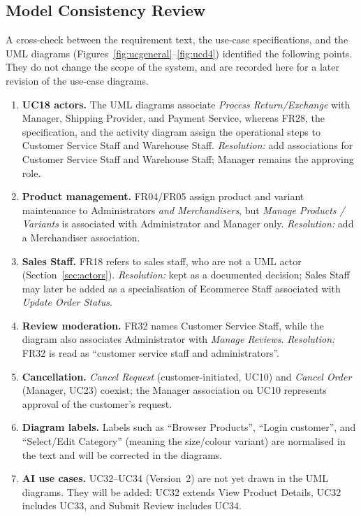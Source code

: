 \documentclass[11pt,a4paper,oneside]{extreport}
\newif\ifshowvtwo
\newcommand{\upd}[1]{\ifshowvtwo\textcolor{red}{#1}\else#1\fi}
\begin{document}
\subsection{Model Consistency Review}
A cross-check between the requirement text, the use-case specifications, and the UML diagrams (Figures~\ref{fig:ucgeneral}--\ref{fig:ucd4}) identified the following points. They do not change the scope of the system, and are recorded here for a later revision of the use-case diagrams.
\begin{enumerate}
  \item \textbf{UC18 actors.} The UML diagrams associate \emph{Process Return/Exchange} with Manager, Shipping Provider, and Payment Service, whereas FR28, the specification, and the activity diagram assign the operational steps to Customer Service Staff and Warehouse Staff. \emph{Resolution:} add associations for Customer Service Staff and Warehouse Staff; Manager remains the approving role.
  \item \textbf{Product management.} FR04/FR05 assign product and variant maintenance to Administrators \emph{and Merchandisers}, but \emph{Manage Products / Variants} is associated with Administrator and Manager only. \emph{Resolution:} add a Merchandiser association.
  \item \textbf{Sales Staff.} FR18 refers to sales staff, who are not a UML actor (Section~\ref{sec:actors}). \emph{Resolution:} kept as a documented decision; Sales Staff may later be added as a specialisation of Ecommerce Staff associated with \emph{Update Order Status}.
  \item \textbf{Review moderation.} FR32 names Customer Service Staff, while the diagram also associates Administrator with \emph{Manage Reviews}. \emph{Resolution:} FR32 is read as ``customer service staff and administrators''.
  \item \textbf{Cancellation.} \emph{Cancel Request} (customer-initiated, UC10) and \emph{Cancel Order} (Manager, UC23) coexist; the Manager association on UC10 represents approval of the customer's request.
  \item \textbf{Diagram labels.} Labels such as ``Browser Products'', ``Login customer'', and ``Select/Edit Category'' (meaning the size/colour variant) are normalised in the text and will be corrected in the diagrams.
  \item \upd{\textbf{AI use cases.} UC32--UC34 (Version~2) are not yet drawn in the UML diagrams. They will be added: UC32 extends View Product Details, UC32 includes UC33, and Submit Review includes UC34.}
\end{enumerate}
\end{document}
